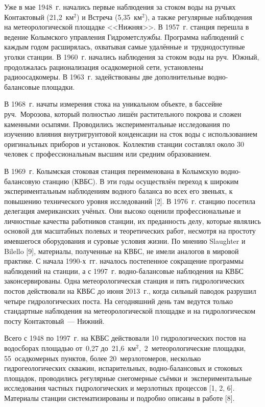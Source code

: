 Уже в мае 1948~г. начались первые наблюдения за стоком воды на ручьях Контактовый (21,2~км$^2$) и Встреча (5,35~км$^2$), а также регулярные наблюдения на метеорологической площадке <<Нижняя>>. В 1957~г. станция перешла в ведение Колымского управления Гидрометслужбы. Программа наблюдений с каждым годом расширялась, охватывая самые удалённые и~труднодоступные уголки станции. В 1960~г. начались наблюдения за стоком воды на руч.~Южный, продолжалась рационализация осадкомерной сети, установлены радиоосадкомеры. В 1963~г. задействованы две дополнительные водно-балансовые площадки.

В 1968~г. начаты измерения стока на уникальном объекте, в бассейне руч.~Морозова, который полностью лишён растительного покрова и сложен каменными осыпями. Проводились экспериментальные исследования по изучению влияния внутригрунтовой конденсации на сток воды с использованием оригинальных приборов и установок. Коллектив станции составлял около 30 человек с профессиональным высшим или средним образованием.

В 1969~г. Колымская стоковая станция переименована в Колымскую водно-балансовую станцию (КВБС). В эти годы осуществлён переход к широким экспериментальным наблюдениям водного баланса во всех его звеньях, к повышению технического уровня исследований [2]. В 1976~г. станцию посетила делегация американских учёных. Они высоко оценили профессиональные и личностные качества работников станции, их преданность делу, которые являлись основой для масштабных полевых и теоретических работ, несмотря на простоту имевшегося оборудования и суровые условия жизни. По мнению Slaughter и Bilello [9], материалы, полученные на КВБС, не имели аналогов в мировой практике.
\clearpage
С начала 1990-х~гг. началось постепенное сокращение программы наблюдений на станции, а с 1997~г. водно-балансовые наблюдения на КВБС законсервированы. Одна метеорологическая станция и пять гидрологических постов действовали на КВБС до июня 2013~г., когда сильный паводок разрушил четыре гидрологических поста. На сегодняшний день там ведутся только стандартные наблюдения на метеорологической площадке и на гидрологическом посту Контактовый~--- Нижний.

Всего с 1948 по 1997~г. на КВБС действовали 10 гидрологических постов на водосборах площадью от~0,27 до~21,6~км$^2,$ 2~метеорологические площадки, 55~осадкомерных пунктов, более 20~мерзлотомеров, несколько гидрогеологических скважин, испарительных, водно-балансовых и стоковых площадок, проводились регулярные снегомерные съёмки и~экспериментальные исследования частных гидрологических и мерзлотных процессов [1, 2, 6]. Материалы станции систематизированы и подробно описаны в работе [8].


